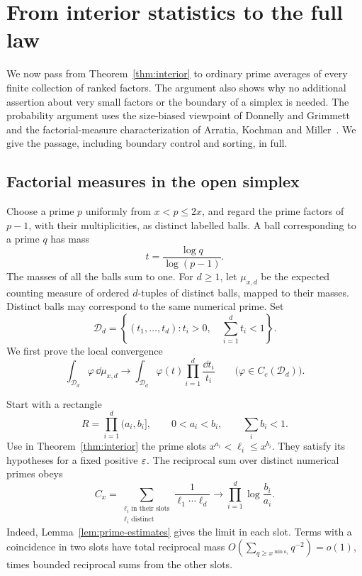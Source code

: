 \section{From interior statistics to the full law}
\label{pd:section}

We now pass from Theorem~\ref{thm:interior} to ordinary prime averages
of every finite collection of ranked factors.  The argument also shows
why no additional assertion about very small factors or the boundary
of a simplex is needed.
The probability argument uses the size-biased viewpoint of
Donnelly and Grimmett~\cite[Section~2]{DonnellyGrimmett} and the
factorial-measure characterization of
Arratia, Kochman and Miller~\cite[Lemma~2 and Section~3.3]{ArratiaKochmanMiller2014}.
We give the passage, including boundary control and sorting, in full.

\subsection{Factorial measures in the open simplex}

Choose a prime $p$ uniformly from $x<p\leq 2x$, and regard the prime
factors of $p-1$, with their multiplicities, as distinct labelled balls.
A ball corresponding to a prime $q$ has mass
\[
 t=\frac{\log q}{\log(p-1)}.
\]
The masses of all the balls sum to one.  For $d\geq1$, let $\mu_{x,d}$
be the expected counting measure of ordered $d$-tuples of distinct
balls, mapped to their masses.  Distinct balls may correspond to the
same numerical prime.  Set
\begin{equation}\label{pd:open-simplex}
 \mathcal D_d=\left\{(t_1,\ldots,t_d):t_i>0,\quad
                                      \sum_{i=1}^d t_i<1\right\}.
\end{equation}
We first prove the local convergence
\begin{equation}\label{pd:factorial-convergence}
 \int_{\mathcal D_d}\varphi\,\dd\mu_{x,d}
 \longrightarrow
 \int_{\mathcal D_d}\varphi(t)\prod_{i=1}^d\frac{\dd t_i}{t_i}
 \qquad\bigl(\varphi\in C_c(\mathcal D_d)\bigr).
\end{equation}

Start with a rectangle
\begin{equation}\label{pd:admissible-rectangle}
 R=\prod_{i=1}^d(a_i,b_i],\qquad
 0<a_i<b_i,\qquad\sum_i b_i<1.
\end{equation}
Use in Theorem~\ref{thm:interior} the prime slots
$x^{a_i}<\ell_i\leq x^{b_i}$.  They satisfy its hypotheses for a fixed
positive $\varepsilon$.  The reciprocal sum over distinct numerical primes
obeys
\begin{equation}\label{pd:rectangle-main-term}
 C_x=\sum_{\substack{\ell_i\text{ in their slots}\\
                       \ell_i\text{ distinct}}}\frac1{\ell_1\cdots\ell_d}
 \longrightarrow\prod_{i=1}^d\log\frac{b_i}{a_i}.
\end{equation}
Indeed, Lemma~\ref{lem:prime-estimates} gives the limit in each slot.
Terms with a coincidence in two slots have total reciprocal mass
$O(\sum_{q\geq x^{\min a_i}}q^{-2})=o(1)$, times bounded reciprocal
sums from the other slots.

